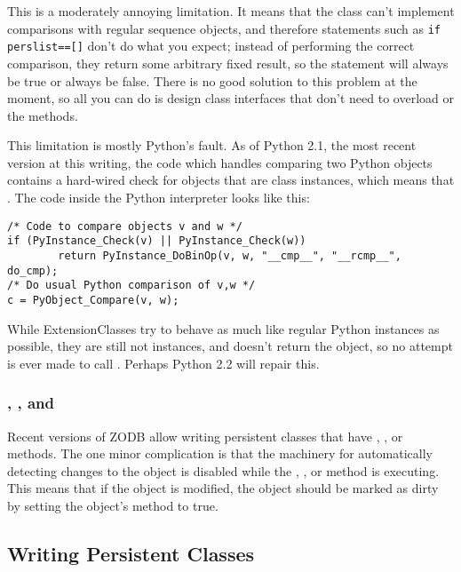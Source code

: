 This is a moderately annoying limitation.  It means that the
 class can't implement comparisons with regular
sequence objects, and therefore statements such as 
\verb|if perslist==[]| don't do what you expect; instead of performing the correct
comparison, they return some arbitrary fixed result, so the 
statement will always be true or always be false.  There is no good
solution to this problem at the moment, so all you can do is design
class interfaces that don't need to overload
 or the  methods.

This limitation is mostly Python's fault.  As of Python 2.1, the most
recent version at this writing, the code which handles comparing two
Python objects contains a hard-wired check for objects that are class
instances, which means that .
The code inside the Python interpreter looks like this:

\begin{verbatim}
/* Code to compare objects v and w */
if (PyInstance_Check(v) || PyInstance_Check(w))
        return PyInstance_DoBinOp(v, w, "__cmp__", "__rcmp__", do_cmp);
/* Do usual Python comparison of v,w */
c = PyObject_Compare(v, w);
\end{verbatim}

While ExtensionClasses try to behave as much like regular Python
instances as possible, they are still not instances, and
 doesn't return the  object, so 
no attempt is ever made to call .  Perhaps Python 2.2
will repair this.

\subsubsection{, , and }

Recent versions of ZODB allow writing persistent classes that have
, , or 
methods.  The one minor complication is that the machinery for
automatically detecting changes to the object is disabled while the
, , or 
method is executing.  This means that if the object is modified, the
object should be marked as dirty by setting the object's
 method to true.

\subsection{Writing Persistent Classes}

